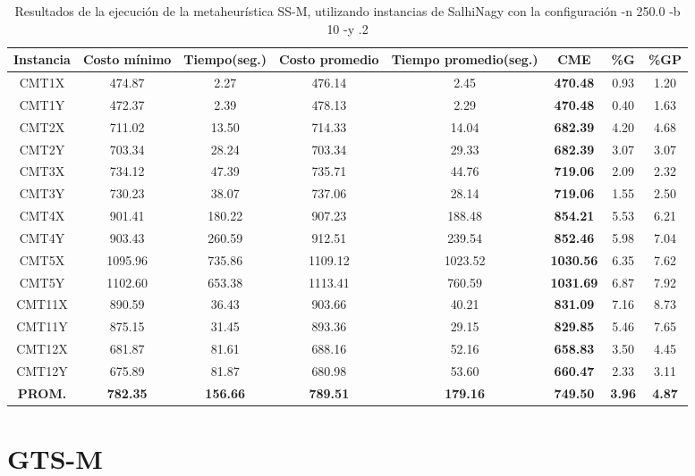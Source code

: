 \begin{table}[h]
\caption{Resultados de la ejecución de la metaheurística SS-M, utilizando instancias de SalhiNagy con la configuración -n 250.0 -b 10 -y .2}
\centering
\small
\begin{tabular}{c c c c c c c c}
\hline\hline
Instancia & Costo mínimo & Tiempo(seg.) & Costo promedio & Tiempo promedio(seg.) & CME & \%G & \%GP \\ [0.5ex]
\hline
CMT1X & 474.87 & 2.27 & 
476.14 & 2.45 & \bf{470.48} & 
0.93 & 1.20\\CMT1Y & 472.37 & 2.39 & 
478.13 & 2.29 & \bf{470.48} & 
0.40 & 1.63\\CMT2X & 711.02 & 13.50 & 
714.33 & 14.04 & \bf{682.39} & 
4.20 & 4.68\\CMT2Y & 703.34 & 28.24 & 
703.34 & 29.33 & \bf{682.39} & 
3.07 & 3.07\\CMT3X & 734.12 & 47.39 & 
735.71 & 44.76 & \bf{719.06} & 
2.09 & 2.32\\CMT3Y & 730.23 & 38.07 & 
737.06 & 28.14 & \bf{719.06} & 
1.55 & 2.50\\CMT4X & 901.41 & 180.22 & 
907.23 & 188.48 & \bf{854.21} & 
5.53 & 6.21\\CMT4Y & 903.43 & 260.59 & 
912.51 & 239.54 & \bf{852.46} & 
5.98 & 7.04\\CMT5X & 1095.96 & 735.86 & 
1109.12 & 1023.52 & \bf{1030.56} & 
6.35 & 7.62\\CMT5Y & 1102.60 & 653.38 & 
1113.41 & 760.59 & \bf{1031.69} & 
6.87 & 7.92\\CMT11X & 890.59 & 36.43 & 
903.66 & 40.21 & \bf{831.09} & 
7.16 & 8.73\\CMT11Y & 875.15 & 31.45 & 
893.36 & 29.15 & \bf{829.85} & 
5.46 & 7.65\\CMT12X & 681.87 & 81.61 & 
688.16 & 52.16 & \bf{658.83} & 
3.50 & 4.45\\CMT12Y & 675.89 & 81.87 & 
680.98 & 53.60 & \bf{660.47} & 
2.33 & 3.11\\\bf{PROM.} & 
\bf{782.35} & \bf{156.66} & \bf{789.51} & \bf{179.16} & \bf{749.50} & \bf{3.96} & \bf{4.87}\\[1ex]\hline
\end{tabular}
\label{table:SS-M-250-0.2-S}
\end{table}

\clearpage
\section{GTS-M}\label{tablas-entonacion-GTS-M}

